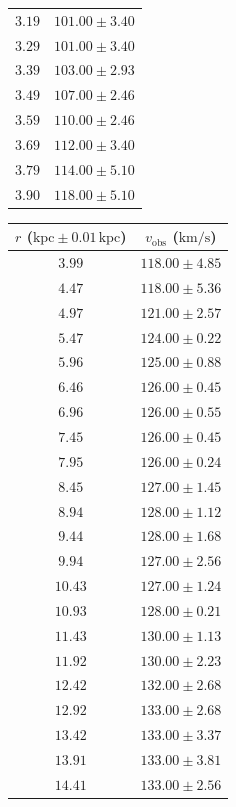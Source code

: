 \documentclass{article}
\newcommand\kpc{\textrm{kpc}}
\newcommand\kmps{\textrm{km}/\textrm{s}}
\newcommand\vobs{\ensuremath{v_{\textrm{obs}}}}
\begin{document}
\begin{table}[h!]
\begin{tabular}{|c|c|}
        $3.19$ & $101.00 \pm 3.40$ \\
        $3.29$ & $101.00 \pm 3.40$ \\
        $3.39$ & $103.00 \pm 2.93$ \\
        $3.49$ & $107.00 \pm 2.46$ \\
        $3.59$ & $110.00 \pm 2.46$ \\
        $3.69$ & $112.00 \pm 3.40$ \\
        $3.79$ & $114.00 \pm 5.10$ \\
        $3.90$ & $118.00 \pm 5.10$ \\
        \hline
    \end{tabular}
    \hfill
    \begin{tabular}{|c|c|}
        \hline
        $r$ ($\kpc \pm 0.01 \,\kpc$) & $\vobs$ ($\kmps$) \\
        \hline
        $3.99$ & $118.00 \pm 4.85$ \\
        $4.47$ & $118.00 \pm 5.36$ \\
        $4.97$ & $121.00 \pm 2.57$ \\
        $5.47$ & $124.00 \pm 0.22$ \\
        $5.96$ & $125.00 \pm 0.88$ \\
        $6.46$ & $126.00 \pm 0.45$ \\
        $6.96$ & $126.00 \pm 0.55$ \\
        $7.45$ & $126.00 \pm 0.45$ \\
        $7.95$ & $126.00 \pm 0.24$ \\
        $8.45$ & $127.00 \pm 1.45$ \\
        $8.94$ & $128.00 \pm 1.12$ \\
        $9.44$ & $128.00 \pm 1.68$ \\
        $9.94$ & $127.00 \pm 2.56$ \\
        $10.43$ & $127.00 \pm 1.24$ \\
        $10.93$ & $128.00 \pm 0.21$ \\
        $11.43$ & $130.00 \pm 1.13$ \\
        $11.92$ & $130.00 \pm 2.23$ \\
        $12.42$ & $132.00 \pm 2.68$ \\
        $12.92$ & $133.00 \pm 2.68$ \\
        $13.42$ & $133.00 \pm 3.37$ \\
        $13.91$ & $133.00 \pm 3.81$ \\
        $14.41$ & $133.00 \pm 2.56$ \\

\end{tabular}
\end{table}
\end{document}
